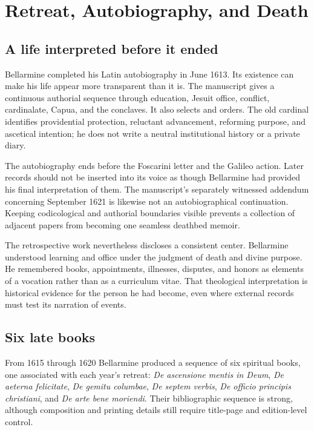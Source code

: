 \section{Retreat, Autobiography, and Death}

\subsection{A life interpreted before it ended}

Bellarmine completed his Latin autobiography in June 1613.  Its existence can
make his life appear more transparent than it is.  The manuscript gives a
continuous authorial sequence through education, Jesuit office, conflict,
cardinalate, Capua, and the conclaves.  It also selects and orders.  The old
cardinal identifies providential protection, reluctant advancement, reforming
purpose, and ascetical intention; he does not write a neutral institutional
history or a private diary.

The autobiography ends before the Foscarini letter and the Galileo action.
Later records should not be inserted into its voice as though Bellarmine had
provided his final interpretation of them.  The manuscript's separately
witnessed addendum concerning September 1621 is likewise not an
autobiographical continuation.  Keeping codicological and authorial boundaries
visible prevents a collection of adjacent papers from becoming one seamless
deathbed memoir.

The retrospective work nevertheless discloses a consistent center.  Bellarmine
understood learning and office under the judgment of death and divine purpose.
He remembered books, appointments, illnesses, disputes, and honors as elements
of a vocation rather than as a curriculum vitae.  That theological
interpretation is historical evidence for the person he had become, even where
external records must test its narration of events.

\subsection{Six late books}

From 1615 through 1620 Bellarmine produced a sequence of six spiritual books,
one associated with each year's retreat: \emph{De ascensione mentis in Deum},
\emph{De aeterna felicitate}, \emph{De gemitu columbae}, \emph{De septem
verbis}, \emph{De officio principis christiani}, and \emph{De arte bene
moriendi}.  Their bibliographic sequence is strong, although composition and
printing details still require title-page and edition-level control.

